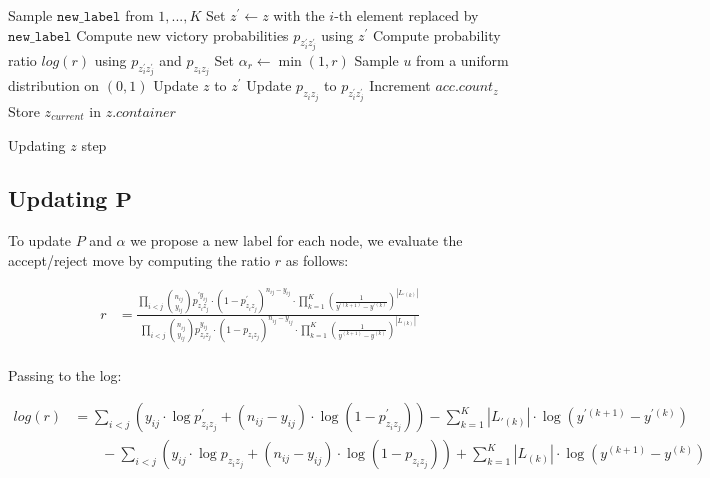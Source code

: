 \documentclass[11pt]{amsart}
\begin{document}
\begin{algorithm}
\begin{algorithmic}[1]
\State Sample $\texttt{new\_label}$ from $1,...,K$
\State Set $z^{\prime} \gets z$ with the $i$-th element replaced by $\texttt{new\_label}$
\State Compute new victory probabilities $p_{z^{\prime}_i z^{\prime}_j}$ using $z^{\prime}$
\State Compute probability ratio $log(r)$  using $p_{z^{\prime}_i z^{\prime}_j}$ and $p_{z_i z_j}$
\State Set $\alpha_{r} \gets \min(1, r)$
\State Sample $u$ from a uniform distribution on $(0,1)$
\State Update $z$ to $z^{\prime}$
\State Update $p_{z_iz_j}$ to $p_{z^{\prime}_i z^{\prime}_j}$
\State Increment $acc.count_{z}$
\EndIf
\State Store $z_{current}$ in $z.container$
\EndFor
\end{algorithmic}
\label{alg:z_update}
\caption{Updating $z$ step}
\end{algorithm}


\subsection{Updating $\mathbf{P}$}


To update $P$ and $\alpha$ we propose a new label for each node, we evaluate the accept/reject move by computing the ratio $r$ as follows:

\begin{align}
r &= \frac{\prod_{i<j}\binom{n_{ij}}{y_{ij}}p_{z_i z_j}^{\prime y_{ij}} \cdot (1 - p^{\prime}_{z_i z_j})^{n_{ij} - y_{ij}} \cdot \prod_{k=1}^K  \left( \frac{1}{y^{\prime (k+1)} - y^{\prime(k)}}\right)^{|L_{\prime(k)}|}}{\prod_{i<j}\binom{n_{ij}}{y_{ij}}p_{z_i z_j}^{y_{ij}} \cdot (1 - p_{z_i z_j})^{n_{ij} - y_{ij}} \cdot \prod_{k=1}^K  \left( \frac{1}{y^{(k+1)} - y^{(k)}}\right)^{|L_{(k)}|}} \\
\end{align}


Passing to the log:

\begin{align}
log(r) &= \sum_{i<j} \left(  y_{ij} \cdot \log{ p^{\prime}_{z_i z_j} } + (n_{ij} - y_{ij}) \cdot \log{ (1 - p^{\prime}_{z_i z_j}) } \right)  - \sum_{k=1}^K |L_{\prime(k)}| \cdot \log{\left( y^{\prime(k+1)} - y^{\prime(k)} \right)}\\
 &\qquad - \sum_{i<j} \left(  y_{ij} \cdot \log{ p_{z_i z_j} } + (n_{ij} - y_{ij}) \cdot \log{ (1 - p_{z_i z_j}) } \right)  + \sum_{k=1}^K |L_{(k)}| \cdot \log{\left( y^{(k+1)} - y^{(k)} \right) }
\end{align}
\end{document}
